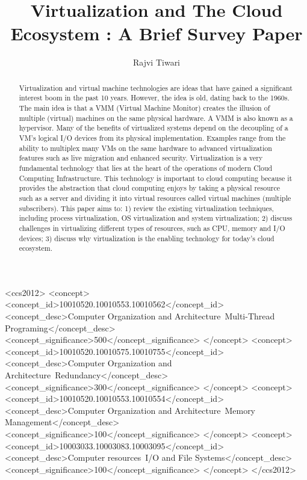 \documentclass[acmtog, authorversion]{acmart}
\begin{document}
\title{Virtualization and The Cloud Ecosystem : A Brief Survey Paper}

\author{Rajvi Tiwari}

\renewcommand\shortauthors{Tiwari, R. et al}

\begin{abstract}
Virtualization and virtual machine technologies are ideas 
that have gained a significant interest boom in the past 10 years. 
However, the idea is old, dating back to the 1960s. The main idea
is that a VMM (Virtual Machine Monitor) creates the illusion of 
multiple (virtual) machines on the same physical hardware. A VMM
is also known as a hypervisor. Many of the benefits of virtualized 
systems depend on the decoupling of a VM's logical I/O devices from its physical implementation. 
Examples range from the ability to multiplex many VMs on the same 
hardware to advanced virtualization features such as live migration 
and enhanced security. Virtualization is a very fundamental technology that lies at the
heart of the operations of modern Cloud Computing Infrastructure. This
technology is important to cloud computing because it provides the 
abstraction that cloud computing enjoys by taking a physical resource 
such as a server and dividing it into virtual resources called virtual
machines (multiple subscribers). This paper aims to:
1) review the existing virtualization techniques, including process 
virtualization, OS virtualization and system virtualization; 2) discuss challenges in virtualizing different types of resources, such as CPU, memory and I/O devices; 3) discuss why virtualization is the enabling technology for today's cloud ecosystem.
\end{abstract}


%
%
\begin{CCSXML}
<ccs2012>
 <concept>
  <concept_id>10010520.10010553.10010562</concept_id>
  <concept_desc>Computer Organization and Architecture~Multi-Thread Programing</concept_desc>
  <concept_significance>500</concept_significance>
 </concept>
 <concept>
  <concept_id>10010520.10010575.10010755</concept_id>
  <concept_desc>Computer Organization and Architecture~Redundancy</concept_desc>
  <concept_significance>300</concept_significance>
 </concept>
 <concept>
  <concept_id>10010520.10010553.10010554</concept_id>
  <concept_desc>Computer Organization and Architecture~Memory Management</concept_desc>
  <concept_significance>100</concept_significance>
 </concept>
 <concept>
  <concept_id>10003033.10003083.10003095</concept_id>
  <concept_desc>Computer resources~I/O and File Systems</concept_desc>
  <concept_significance>100</concept_significance>
 </concept>
</ccs2012>
\end{CCSXML}
\end{document}
